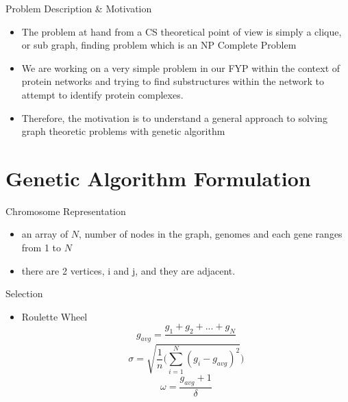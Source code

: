 \documentclass[aspectratio=169,xcolor=dvipsnames]{beamer}
\begin{document}
\begin{frame}{Problem Description \& Motivation}
    \begin{itemize}
    \item The problem at hand from a CS theoretical point of view is simply a clique, or sub graph, finding problem which is an NP Complete Problem 
    \item We are working on a very simple problem in our FYP within the context of protein networks and trying to find substructures within the network to attempt to identify protein complexes. 
    \item Therefore, the motivation is to understand a general approach to solving graph theoretic problems with genetic algorithm
    \end{itemize}
\end{frame}

\section{Genetic Algorithm Formulation}
\begin{frame}{Chromosome Representation}
    \begin{itemize}
        \item an array of $N$, number of nodes in the graph, genomes and each gene ranges from 1 to $N$
        \item there are 2 vertices, i and j, and they are adjacent. 
    \end{itemize}
\end{frame}


\begin{frame}{Selection}
    \begin{itemize}
        \item Roulette Wheel \\
        \[g_{avg} = \frac{g_{1} + g_{2} + ... + g_{N}}{}\]
        \[\sigma = \sqrt{\frac{1}{n}(\sum_{i=1}^{N}(g_{i} - g_{avg})^{2}})\]
        \[\omega = \frac{g_{avg} + 1}{\delta}\]
    \end{itemize}
\end{frame}
\end{document}
